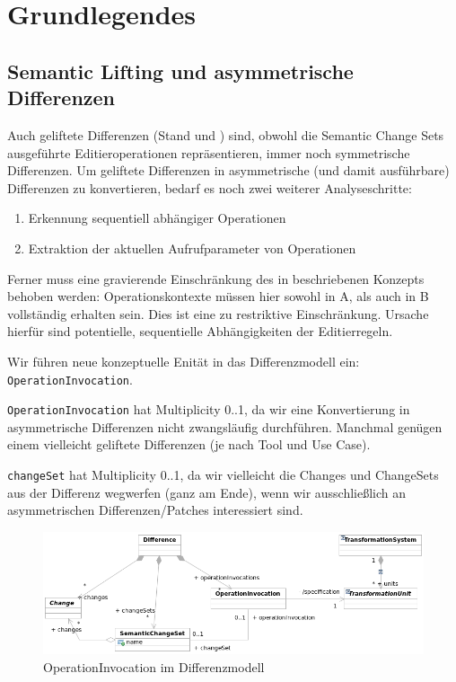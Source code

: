 



\newcommand{\mynote}[2]{\textbf{{#1}:}\textit{{#2}}}
\newcommand\timo[1]{\mynote{TIMO}{#1}}
\newcommand\manu[1]{\mynote{MANUEL}{#1}}




\tableofcontents


\section{Grundlegendes}

\subsection{Semantic Lifting und asymmetrische Differenzen}
Auch geliftete Differenzen (Stand \cite{KeKT2011ASE} und \cite{Oh2012BA}) sind, 
obwohl die Semantic Change Sets ausgeführte Editieroperationen repräsentieren, 
immer noch symmetrische Differenzen.
Um geliftete Differenzen in asymmetrische (und damit ausführbare) Differenzen 
zu konvertieren, bedarf es noch zwei weiterer Analyseschritte:
\begin{enumerate}
 \item Erkennung sequentiell abhängiger Operationen
 \item Extraktion der aktuellen Aufrufparameter von Operationen
\end{enumerate}

Ferner muss eine gravierende Einschränkung des in \cite{KeKT2011ASE}
beschriebenen Konzepts behoben werden: Operationskontexte müssen
hier sowohl in A, als auch in B vollständig erhalten sein. Dies
ist eine zu restriktive Einschränkung. 
Ursache hierfür sind potentielle, sequentielle Abhängigkeiten der 
Editierregeln.


Wir führen neue konzeptuelle Enität in das Differenzmodell ein: \texttt{OperationInvocation}. 

\texttt{OperationInvocation} hat Multiplicity 0..1, da wir eine Konvertierung in asymmetrische Differenzen nicht zwangsläufig durchführen. Manchmal genügen einem vielleicht geliftete Differenzen (je nach Tool und Use Case). 

\texttt{changeSet} hat Multiplicity 0..1, da wir vielleicht die Changes und ChangeSets aus der Differenz wegwerfen (ganz am Ende), wenn wir ausschließlich an asymmetrischen Differenzen/Patches interessiert sind.

\begin{figure}[htb]
  \centering
  \includegraphics[width=1.0\textwidth]{img/OperationInvocation.png}
  \caption{OperationInvocation im Differenzmodell}
  \label{fig:OperationInvocation}
\end{figure}



